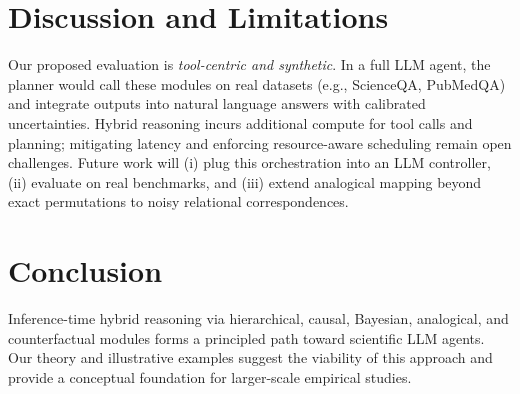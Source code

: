 \documentclass[11pt]{article}
\begin{document}
\section{Discussion and Limitations}
Our proposed evaluation is \emph{tool-centric and synthetic}. In a full LLM agent, the planner would call these modules on real datasets (e.g., ScienceQA, PubMedQA) and integrate outputs into natural language answers with calibrated uncertainties. Hybrid reasoning incurs additional compute for tool calls and planning; mitigating latency and enforcing resource-aware scheduling remain open challenges. Future work will (i) plug this orchestration into an LLM controller, (ii) evaluate on real benchmarks, and (iii) extend analogical mapping beyond exact permutations to noisy relational correspondences.

\section{Conclusion}
Inference-time hybrid reasoning via hierarchical, causal, Bayesian, analogical, and counterfactual modules forms a principled path toward scientific LLM agents. Our theory and illustrative examples suggest the viability of this approach and provide a conceptual foundation for larger-scale empirical studies.



\end{document}
